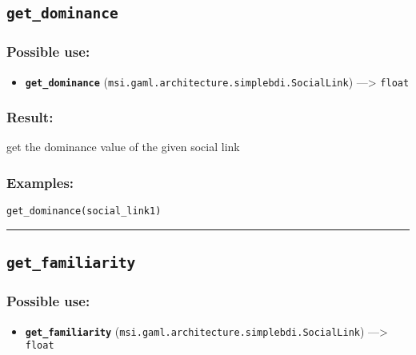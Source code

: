 \documentclass[]{book}
\providecommand{\tightlist}{%
  \setlength{\itemsep}{0pt}\setlength{\parskip}{0pt}}
\theoremstyle{definition}
\theoremstyle{definition}
\theoremstyle{definition}
\theoremstyle{remark}
\begin{document}
\subsection{\texorpdfstring{\texttt{get\_dominance}}{get\_dominance}}\label{get_dominance}

\subsubsection{Possible use:}\label{possible-use-207}

\begin{itemize}
\tightlist
\item
  \textbf{\texttt{get\_dominance}}
  (\texttt{msi.gaml.architecture.simplebdi.SocialLink})
  ---\textgreater{} \texttt{float}
\end{itemize}

\subsubsection{Result:}\label{result-201}

get the dominance value of the given social link

\subsubsection{Examples:}\label{examples-154}

\begin{verbatim}
get_dominance(social_link1) 
\end{verbatim}

\begin{center}\rule{0.5\linewidth}{\linethickness}\end{center}

\subsection{\texorpdfstring{\texttt{get\_familiarity}}{get\_familiarity}}\label{get_familiarity}

\subsubsection{Possible use:}\label{possible-use-208}

\begin{itemize}
\tightlist
\item
  \textbf{\texttt{get\_familiarity}}
  (\texttt{msi.gaml.architecture.simplebdi.SocialLink})
  ---\textgreater{} \texttt{float}
\end{itemize}
\end{document}
